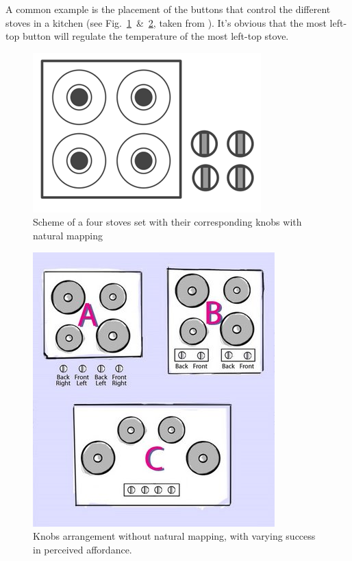 \documentclass[a4paper,11pt] {article}
\theoremstyle{definition}
\begin{document}
A common example is the placement of the buttons that control the different stoves in a kitchen (see Fig.~\ref{fig:natural-mapping-1}~\&~\ref{fig:natural-mapping-2}, taken from \cite{stoveMapping}). It's obvious that the most left-top button will regulate the temperature of the most left-top stove.\\
 \begin{minipage}{\linewidth}
      \centering
      \begin{minipage}{0.45\linewidth}
          \begin{figure}[H]
          \centering
              \includegraphics[scale=0.3]{fig-report/stove_natural.png}
              \caption{Scheme of a four stoves set with their corresponding knobs with natural mapping}
              \label{fig:natural-mapping-1}
          \end{figure}
      \end{minipage}
      \hspace{0.05\linewidth}
      \begin{minipage}{0.45\linewidth}
          \begin{figure}[H]
                    \centering
              \includegraphics[scale=0.4]{fig-report/NormanBurners.jpg}
              \caption{Knobs arrangement without natural mapping, with varying success in perceived affordance.}
              \label{fig:natural-mapping-2}
          \end{figure}
      \end{minipage}
  \end{minipage}
  \bigskip
\end{document}
